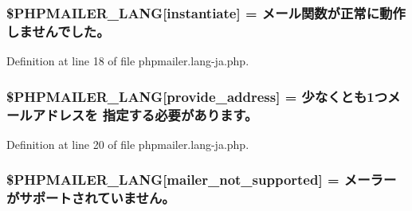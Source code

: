 \subsubsection[{\texorpdfstring{\$\+P\+H\+P\+M\+A\+I\+L\+E\+R\+\_\+\+L\+A\+NG}{$PHPMAILER_LANG}}]{\setlength{\rightskip}{0pt plus 5cm}\$P\+H\+P\+M\+A\+I\+L\+E\+R\+\_\+\+L\+A\+NG\mbox{[}\textquotesingle{}instantiate\textquotesingle{}\mbox{]} = \textquotesingle{}メール関数が正常に動作しませんでした。\textquotesingle{}}\hypertarget{phpmailer_8lang-ja_8php_ad58dde16780f4770ccf4dd282ea1f5ad}{}\label{phpmailer_8lang-ja_8php_ad58dde16780f4770ccf4dd282ea1f5ad}


Definition at line 18 of file phpmailer.\+lang-\/ja.\+php.

\subsubsection[{\texorpdfstring{\$\+P\+H\+P\+M\+A\+I\+L\+E\+R\+\_\+\+L\+A\+NG}{$PHPMAILER_LANG}}]{\setlength{\rightskip}{0pt plus 5cm}\$P\+H\+P\+M\+A\+I\+L\+E\+R\+\_\+\+L\+A\+NG\mbox{[}\textquotesingle{}provide\+\_\+address\textquotesingle{}\mbox{]} = \textquotesingle{}少なくとも1つメールアドレスを 指定する必要があります。\textquotesingle{}}\hypertarget{phpmailer_8lang-ja_8php_a8b97897c2406b7392b056f375feeefbb}{}\label{phpmailer_8lang-ja_8php_a8b97897c2406b7392b056f375feeefbb}


Definition at line 20 of file phpmailer.\+lang-\/ja.\+php.

\subsubsection[{\texorpdfstring{\$\+P\+H\+P\+M\+A\+I\+L\+E\+R\+\_\+\+L\+A\+NG}{$PHPMAILER_LANG}}]{\setlength{\rightskip}{0pt plus 5cm}\$P\+H\+P\+M\+A\+I\+L\+E\+R\+\_\+\+L\+A\+NG\mbox{[}\textquotesingle{}mailer\+\_\+not\+\_\+supported\textquotesingle{}\mbox{]} = \textquotesingle{} メーラーがサポートされていません。\textquotesingle{}}\hypertarget{phpmailer_8lang-ja_8php_aa2ebcb8833ee83a7ad67401c4bb3a6ad}{}\label{phpmailer_8lang-ja_8php_aa2ebcb8833ee83a7ad67401c4bb3a6ad}


